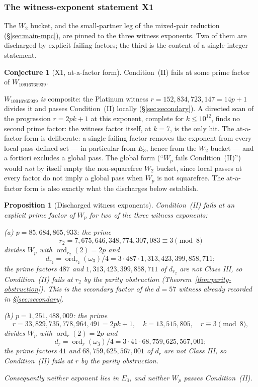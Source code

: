 \documentclass[11pt]{amsart}
\theoremstyle{plain}
\newtheorem{proposition}[theorem]{Proposition}
\theoremstyle{definition}
\newtheorem{conjecture}[theorem]{Conjecture}
\theoremstyle{remark}
\numberwithin{equation}{section}
\newcommand{\ord}{\operatorname{ord}}
\begin{document}
\subsubsection{The witness-exponent statement X1}\label{sec:x1}

The $W_2$ bucket, and the small-partner leg of the mixed-pair reduction (\S\ref{sec:main-mpc}), are pinned to the three witness exponents. Two of them are discharged by explicit failing factors; the third is the content of a single-integer statement.

\begin{conjecture}[X1, at-a-factor form]\label{conj:x1}
Condition~(II) fails at some prime factor of $W_{10916765939}$.
\end{conjecture}

$W_{10916765939}$ \emph{is} composite: the Platinum witness $r = 152{,}834{,}723{,}147 = 14 p + 1$ divides it and passes Condition~(II) locally (\S\ref{sec:secondary}). A directed scan of the progression $r = 2 p k + 1$ at this exponent, complete for $k \leq 10^{12}$, finds no second prime factor: the witness factor itself, at $k = 7$, is the only hit. The at-a-factor form is deliberate: a single failing factor removes the exponent from every local-pass-defined set --- in particular from $E_3$, hence from the $W_2$ bucket --- and a fortiori excludes a global pass. The global form (``$W_{p}$ fails Condition~(II)'') would \emph{not} by itself empty the non-squarefree $W_2$ bucket, since local passes at every factor do not imply a global pass when $W_p$ is not squarefree. The at-a-factor form is also exactly what the discharges below establish.

\begin{proposition}[Discharged witness exponents]\label{prop:witness-discharges}
Condition~(II) fails at an explicit prime factor of $W_p$ for two of the three witness exponents:

(a) $p = 85{,}684{,}865{,}933$: the prime
\[
  r_2 = 7{,}675{,}646{,}348{,}774{,}307{,}083 \equiv 3 \pmod 8
\]
divides $W_p$ with $\ord_{r_2}(2) = 2p$ and
\[
  d_{r_2} = \ord_{r_2}(\omega_3)/4 = 3 \cdot 487 \cdot 1{,}313{,}423{,}399{,}858{,}711;
\]
the prime factors $487$ and $1{,}313{,}423{,}399{,}858{,}711$ of $d_{r_2}$ are not Class III, so Condition~(II) fails at $r_2$ by the parity obstruction (Theorem~\ref{thm:parity-obstruction}). This is the secondary factor of the $d = 57$ witness already recorded in \S\ref{sec:secondary}.

(b) $p = 1{,}251{,}488{,}009$: the prime
\[
  r = 33{,}829{,}735{,}778{,}964{,}491 = 2 p k + 1, \quad k = 13{,}515{,}805, \quad r \equiv 3 \pmod 8,
\]
divides $W_p$ with $\ord_r(2) = 2p$ and
\[
  d_r = \ord_r(\omega_3)/4 = 3 \cdot 41 \cdot 68{,}759{,}625{,}567{,}001;
\]
the prime factors $41$ and $68{,}759{,}625{,}567{,}001$ of $d_r$ are not Class III, so Condition~(II) fails at $r$ by the parity obstruction.

Consequently neither exponent lies in $E_3$, and neither $W_p$ passes Condition~(II).
\end{proposition}
\end{document}
